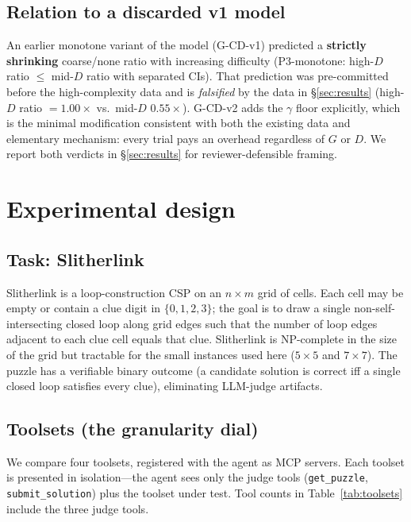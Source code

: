 \documentclass[11pt,letterpaper]{article}
\begin{document}
\subsection*{Relation to a discarded v1 model}

An earlier monotone variant of the model (G-CD-v1) predicted a
\textbf{strictly shrinking} coarse/none ratio with increasing
difficulty (P3-monotone: high-$D$ ratio $\le$ mid-$D$ ratio with
separated CIs). That prediction was pre-committed before the
high-complexity data and is \emph{falsified} by the data in
\S\ref{sec:results} (high-$D$ ratio $= 1.00\times$ vs.\ mid-$D$
$0.55\times$). G-CD-v2 adds the $\gamma$ floor explicitly, which is
the minimal modification consistent with both the existing data and
elementary mechanism: every trial pays an overhead regardless of
$G$ or $D$. We report both verdicts in \S\ref{sec:results} for
reviewer-defensible framing.


\section{Experimental design}
\label{sec:design}

\subsection{Task: Slitherlink}

Slitherlink is a loop-construction CSP on an $n \times m$ grid of
cells. Each cell may be empty or contain a clue digit in $\{0, 1,
2, 3\}$; the goal is to draw a single non-self-intersecting closed
loop along grid edges such that the number of loop edges adjacent
to each clue cell equals that clue. Slitherlink is NP-complete in
the size of the grid \citep{yato2003slitherlink} but tractable for
the small instances used here ($5 \times 5$ and $7 \times 7$). The
puzzle has a verifiable binary outcome (a candidate solution is
correct iff a single closed loop satisfies every clue),
eliminating LLM-judge artifacts.

\subsection{Toolsets (the granularity dial)}

We compare four toolsets, registered with the agent as MCP servers.
Each toolset is presented in isolation---the agent sees only the
judge tools (\texttt{get\_puzzle}, \texttt{submit\_solution}) plus
the toolset under test. Tool counts in Table~\ref{tab:toolsets}
include the three judge tools.
\end{document}
